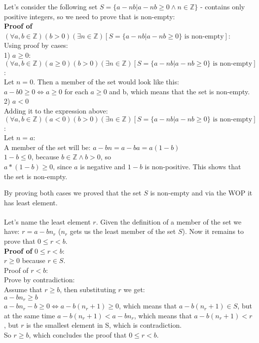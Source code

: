 \documentclass{article}
\begin{document}
Let's consider the following set $S = \{ a - nb | a - nb \geq 0 \wedge n \in \mathbb{Z}\}$ - contains only positive integers, so we need to prove that is non-empty:\\
\textbf{Proof of} $(\forall a,b \in \mathbb{Z})(b>0)(\exists n \in \mathbb{Z})[S = \{ a - nb | a - nb \geq 0\} \textrm{ is non-empty}]$:\\
Using proof by cases:\\
1) $a \geq 0$:\\
$(\forall a,b \in \mathbb{Z})(a \geq 0)(b>0)(\exists n \in \mathbb{Z})[S = \{ a - nb | a - nb \geq 0\} \textrm{ is non-empty}]$:\\
Let $n = 0$. Then a member of the set would look like this:\\
$a - b0 \geq 0 \Leftrightarrow a \geq 0$ for each $a \geq 0$ and b, which means that the set is non-empty.\\
2) $a < 0$\\
Adding it to the expression above: $(\forall a,b \in \mathbb{Z})(a < 0)(b>0)(\exists n \in \mathbb{Z})[S = \{ a - nb | a - nb \geq 0\} \textrm{ is non-empty}]$:\\
Let $n = a$:\\
A member of the set will be: $a - bn = a - ba = a(1 - b)$\\
$1 - b \leq 0$, because $b \in \mathbb{Z} \wedge b > 0$, so\\
$a*(1-b) \geq 0$, since $a$ is negative and $1-b$ is non-positive. This shows that the set is non-empty.

By proving both cases we proved that the set $S$ is non-empty and via the WOP it has least element.\\
\\
Let's name the least element $r$. Given the definition of a member of the set we have: $r = a - bn_r$ ($n_r$ gets us the least member of the set $S$). Now it remains to prove that $0 \leq r < b$.\\
\textbf{Proof of} $0 \leq r < b$:\\
$r \geq 0$ because $r \in S$.\\
Proof of $r < b$:\\
Prove by contradiction:\\
Assume that $r \geq b$, then substituting $r$ we get:\\
$a - bn_r \geq b$\\
$a - bn_r - b \geq 0 \Leftrightarrow a - b(n_r + 1) \geq 0$, which means that $a -b(n_r + 1) \in S$, but at the same time $a - b(n_r + 1) < a - bn_r$, which means that $a - b(n_r + 1) < r$, but $r$ is the smallest element in S, which is contradiction.\\
So $r \geq b$, which concludes the proof that $0 \leq r < b$.\\
\end{document}
